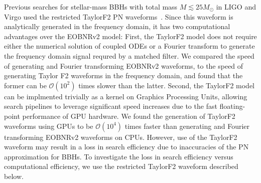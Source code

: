Previous searches for stellar-mass BBHs  with total mass $M \lesssim 25
M_\odot$ in LIGO and Virgo used the restricted TaylorF2 PN
waveforms~\citep{Sathyaprakash:1991mt,Cutler:1994ys,Droz:1999qx}. Since this
waveform is analytically generated in the frequency domain, it has two
computational advantages over the EOBNRv2 model: First, the TaylorF2 model does not require
either the numerical solution of coupled ODEs or a Fourier transform to
generate the frequency domain signal requred by a matched filter. 
We compared the speed of generating and Fourier
transforming EOBNRv2 waveforms, to the speed of generating Taylor F2
waveforms in the frequency domain, and found that the former can be
$\mathcal{O}(10^2)$ times slower than the latter. Second, the TaylorF2 model can be implmented trivially as a
kernel on Graphics Processing Units, allowing search pipelines to leverage
significant speed increases due to the fast floating-point performance of
GPU hardware. We found the generation of TaylorF2 waveforms using GPUs to be
$\mathcal{O}(10^4)$ times faster than generating and Fourier
transforming EOBNRv2 waveforms on CPUs. However, use of the TaylorF2 waveform 
may result in a loss in search efficiency due to inaccuracies of the PN 
approximation for BBHs. To investigate the loss in search efficiency versus 
computational efficiency, we use the restricted TaylorF2 waveform described below.

